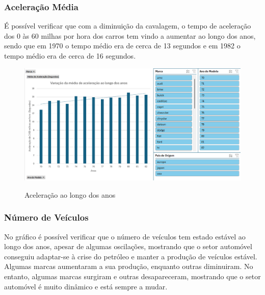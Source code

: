 \documentclass[a4paper]{article}
\begin{document}
\newpage
\subsubsection{Aceleração Média}
É possível verificar que com a diminuição da cavalagem, o tempo de aceleração dos 0 às 60 milhas por hora dos carros tem vindo a 
aumentar ao longo dos anos, sendo que em 1970 o tempo médio era de cerca de 13 segundos e em 1982 o tempo médio
era de cerca de 16 segundos.
\begin{figure}[h!]
    \centering
    \includegraphics[width=1\textwidth]{Recursos/AceleraçãoMediaGrafico.png} %
    \vspace{0.5cm}
    \label{fig:accmg}
    \caption{Aceleração ao longo dos anos}
\end{figure}
\newpage
\subsubsection{Número de Veículos}
No gráfico é possível verificar que o número de veículos tem estado estável ao longo dos anos, apesar de 
algumas oscilações, mostrando que o setor automóvel conseguiu adaptar-se à crise do petróleo e manter a produção
de veículos estável. Algumas marcas aumentaram a sua produção, enquanto outras diminuiram.
No entanto, algumas marcas surgiram e outras desapareceram, mostrando que o setor automóvel é muito dinâmico e
está sempre a mudar.
\end{document}
